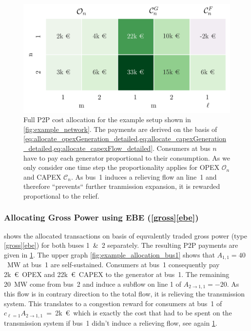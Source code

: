 \documentclass[11pt,twocolumn]{article}
\begin{document}
% 
% 
% 
\begin{figure}[h]
\centering
\includegraphics[width=\linewidth]{example_payoff.png}
\caption{Full P2P cost allocation for the example setup shown in \cref{fig:example_network}. The payments are derived on the basis of \cref{eq:allocate_opexGeneration_detailed,eq:allocate_capexGeneration_detailed,eq:allocate_capexFlow_detailed}. Consumers at bus $n$ have to pay each generator proportional to their consumption. As we only consider one time step the proportionality applies for OPEX $\mathcal{O}_n$ and CAPEX $\mathcal{C}_n$. As bus~1 induces a relieving flow an line~1 and therefore ``prevents`` further tranmission expansion, it is rewarded proportional to the relief.}
\label{fig:example_payoff}
\end{figure}
% 
% 
\subsubsection*{Allocating Gross Power using EBE (\ref{gross}\ref{ebe}) }

 shows the allocated transactions on basis of equvalently traded gross power (type \ref{gross}\ref{ebe}) for both buses 1~\&~2 separately. The resulting P2P payments are given in \cref{fig:example_payoff}.
The upper graph \cref{fig:example_allocation_bus1} shows that $A_{1,1}=40$~MW at bus~1 are self-sustained. Consumers at bus~1 consequently pay 2k~\euro~OPEX and 22k~\euro~CAPEX to the generator at bus~1. The remaining 20~MW come from bus~2 and induce a subflow on line 1 of $A_{2 \rightarrow 1, 1} = -20$. As this flow is in contrary direction to the total flow, it is relieving the transmission system. This translates to a congestion reward for consumers at bus~1 of $c_{\ell=1} A_{2 \rightarrow 1, 1}$~=~2k~\euro\, which is exactly the cost that had to be spent on the transmission system if bus~1 didn't induce a relieving flow, see again \cref{fig:example_payoff}. 
\end{document}
